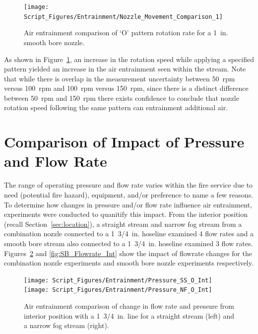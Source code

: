 \documentclass[12pt,oneside]{book}
\begin{document}
\begin{figure}[!ht]
\centering
\texttt{[image: Script\_Figures/Entrainment/Nozzle\_Movement\_Comparison\_1]}
\caption[Air Entrainment Comparison of Pattern Rotation Rate]{Air entrainment comparison of `O' pattern rotation rate for a 1~in. smooth bore nozzle.}
\label{fig:Nozzle_Movement_RotationSpeed_Comparison}
\end{figure}

As shown in Figure~\ref{fig:Nozzle_Movement_RotationSpeed_Comparison}, an increase in the rotation speed while applying a specified pattern yielded an increase in the air entrainment seen within the stream. Note that while there is overlap in the measurement uncertainty between 50~rpm versus 100~rpm and 100~rpm versus 150~rpm, since there is a distinct difference between 50~rpm and 150~rpm there exists confidence to conclude that nozzle rotation speed following the same pattern can entrainment additional air.

\section{Comparison of Impact of Pressure and Flow Rate}

The range of operating pressure and flow rate varies within the fire service due to need (potential fire hazard), equipment, and/or preference to name a few reasons. To determine how changes in pressure and/or flow rate influence air entrainment, experiments were conducted to quanitify this impact. From the interior position (recall Section~\ref{sec:location}), a straight stream and narrow fog stream from a combination nozzle connected to a 1~3/4~in. hoseline examined 4 flow rates and a smooth bore stream also connected to a 1~3/4~in. hoseline examined 3 flow rates. Figures~\ref{fig:SS_NF_FlowRate_Int} and \ref{fig:SB_Flowrate_Int} show the impact of flowrate changes for the combination nozzle experiments and smooth bore nozzle experiments respectively.

\begin{figure}[!ht]
\centering
\texttt{[image: Script\_Figures/Entrainment/Pressure\_SS\_O\_Int]}
\texttt{[image: Script\_Figures/Entrainment/Pressure\_NF\_O\_Int]}
\caption[Air Entrainment Comparison of Pressure and Flow Rate for Interior Combination Nozzle from 1~3/4~in. Line]{Air entrainment comparison of change in flow rate and pressure from interior position with a 1~3/4~in. line for a straight stream (left) and a narrow fog stream (right).}
\label{fig:SS_NF_FlowRate_Int}
\end{figure}
\end{document}

